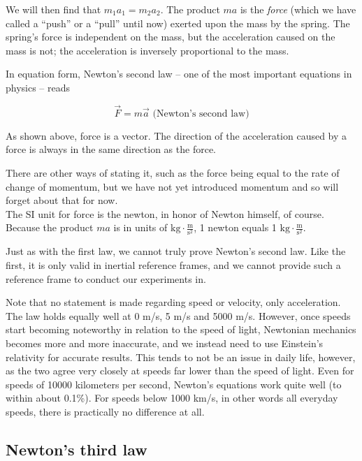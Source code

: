 \documentclass[8.01x]{subfiles}
\begin{document}
We will then find that $m_1 a_1 = m_2 a_2$. The product $m a$ is the \emph{force} (which we have called a ``push'' or a ``pull'' until now) exerted upon the mass by the spring. The spring's force is independent on the mass, but the acceleration caused on the mass is not; the acceleration is inversely proportional to the mass.

In equation form, Newton's second law -- one of the most important equations in physics -- reads

\begin{equation}
\vec{F} = m \vec{a} \text{ (Newton's second law)} \label{eq:newton2}
\end{equation}

As shown above, force is a vector. The direction of the acceleration caused by a force is always in the same direction as the force.

There are other ways of stating it, such as the force being equal to the rate of change of momentum, but we have not yet introduced momentum and so will forget about that for now.\\
The SI unit for force is the newton, in honor of Newton himself, of course. Because the product $m a$ is in units of $\displaystyle \text{kg} \cdot \frac{\text{m}}{\text{s}^2}$, 1 newton equals 1 $\displaystyle \text{kg} \cdot \frac{\text{m}}{\text{s}^2}$.

Just as with the first law, we cannot truly prove Newton's second law. Like the first, it is only valid in inertial reference frames, and we cannot provide such a reference frame to conduct our experiments in.

Note that no statement is made regarding speed or velocity, only acceleration. The law holds equally well at 0 m/s, 5 m/s and 5000 m/s. However, once speeds start becoming noteworthy in relation to the speed of light, Newtonian mechanics becomes more and more inaccurate, and we instead need to use Einstein's relativity for accurate results. This tends to not be an issue in daily life, however, as the two agree very closely at speeds far lower than the speed of light. Even for speeds of 10000 kilometers per second, Newton's equations work quite well (to within about 0.1\%). For speeds below 1000 km/s, in other words all everyday speeds, there is practically no difference at all.

\subsection{Newton's third law}
\end{document}
